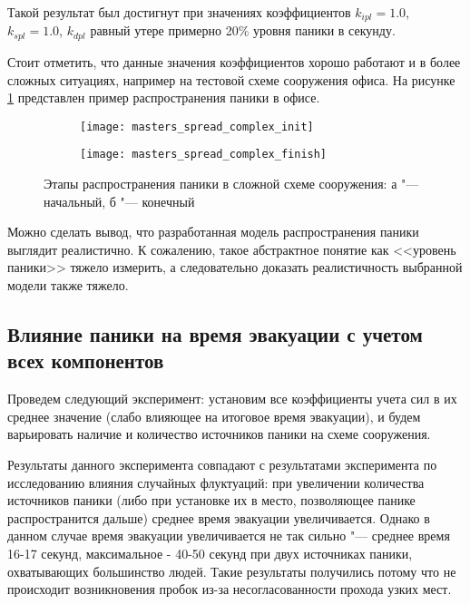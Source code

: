 Такой результат был достигнут при значениях коэффициентов $k_{ipl} = 1.0$, $k_{spl} = 1.0$, $k_{dpl}$ равный утере примерно 20\% уровня паники в секунду.

Стоит отметить, что данные значения коэффициентов хорошо работают и в более сложных ситуациях, например на тестовой схеме сооружения офиса.
На рисунке \ref{sec:results:panic_spread:office} представлен пример распространения паники в офисе.

\begin{figure}[ht!]
  \centering
  \begin{subfigure}[!htb]{1.0\textwidth}
    \centering
    \texttt{[image: masters\_spread\_complex\_init]}
    \caption{}
  \end{subfigure}
  \begin{subfigure}[!htb]{1.0\textwidth}
    \centering
    \texttt{[image: masters\_spread\_complex\_finish]}
    \caption{}
  \end{subfigure}
  \caption{Этапы распространения паники в сложной схеме сооружения: а "--- начальный, б "--- конечный}
  \label{sec:results:panic_spread:office}
\end{figure}

Можно сделать вывод, что разработанная модель распространения паники выглядит реалистично.
К сожалению, такое абстрактное понятие как <<уровень паники>> тяжело измерить,
а следовательно доказать реалистичность выбранной модели также тяжело.

\subsection{Влияние паники на время эвакуации с учетом всех компонентов}
\label{sec:results:general}

Проведем следующий эксперимент: установим все коэффициенты учета сил в их среднее значение
(слабо влияющее на итоговое время эвакуации), и будем варьировать наличие и количество источников паники
на схеме сооружения.

Результаты данного эксперимента совпадают с результатами эксперимента по исследованию влияния случайных флуктуаций:
при увеличении количества источников паники (либо при установке их в место, позволяющее панике распространится дальше)
среднее время эвакуации увеличивается.
Однако в данном случае время эвакуации увеличивается не так сильно "---
среднее время 16-17 секунд, максимальное - 40-50 секунд при двух источниках паники, охватывающих большинство людей.
Такие результаты получились потому что не происходит возникновения пробок из-за несогласованности прохода узких мест.

